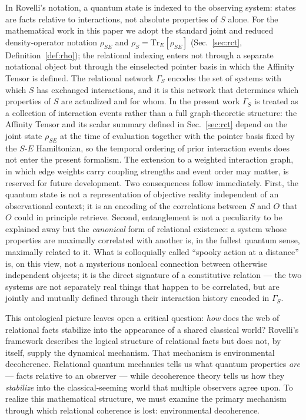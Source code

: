 In Rovelli's notation, a quantum state is indexed to the observing
system: states are facts relative to interactions, not absolute
properties of $S$ alone.
For the mathematical work in this paper we adopt the standard joint
and reduced density-operator notation $\rho_{SE}$ and
$\rho_S = \mathrm{Tr}_E[\rho_{SE}]$ (Sec.~\ref{sec:rct},
Definition~\ref{def:rho}); the relational indexing enters not through
a separate notational object but through the einselected pointer basis
in which the Affinity Tensor is defined.
The relational network $\Gamma_S$ encodes the set of systems
with which $S$ has exchanged interactions, and it is this network that
determines which properties of $S$ are actualized and for whom.
In the present work $\Gamma_S$ is treated as a collection of
interaction events rather than a full graph-theoretic structure: the
Affinity Tensor and its scalar summary defined in
Sec.~\ref{sec:rct} depend on the joint state $\rho_{SE}$ at the time
of evaluation together with the pointer basis fixed by the
$S$-$E$ Hamiltonian, so the temporal ordering of prior interaction
events does not enter the present formalism.
The extension to a weighted interaction graph, in which edge weights
carry coupling strengths and event order may matter, is reserved for
future development.
Two consequences follow immediately.
First, the quantum state is not a representation of objective reality
independent of an observational context; it is an encoding of the
correlations between $S$ and $O$ that $O$ could in principle retrieve.
Second, entanglement is not a peculiarity to be explained away but the
\emph{canonical} form of relational existence: a system whose properties
are maximally correlated with another is, in the fullest quantum sense,
maximally related to it.
What is colloquially called ``spooky action at a distance'' is, on this
view, not a mysterious nonlocal connection between otherwise independent
objects; it is the direct signature of a constitutive relation ---
the two systems are not separately real things that happen to be
correlated, but are jointly and mutually defined through their
interaction history encoded in $\Gamma_S$.

This ontological picture leaves open a critical question: \emph{how}
does the web of relational facts stabilize into the appearance of a
shared classical world?
Rovelli's framework describes the logical structure of relational
facts but does not, by itself, supply the dynamical mechanism.
That mechanism is environmental decoherence.
Relational quantum mechanics tells us what quantum properties
\emph{are} --- facts relative to an observer --- while decoherence
theory tells us how they \emph{stabilize} into the classical-seeming
world that multiple observers agree upon.
To realize this mathematical structure, we must examine the primary
mechanism through which relational coherence is lost: environmental
decoherence.

